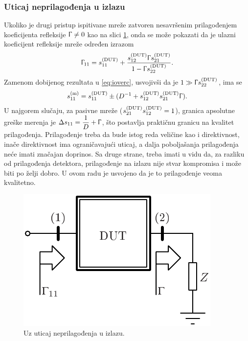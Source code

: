 \documentclass[a4paper, 12pt, diplomski]{etf}
\begin{document}
\subsubsection{Uticaj neprilagođenja u izlazu }
%
Ukoliko je drugi pristup ispitivane mreže zatvoren nesavršenim
prilagođenjem koeficijenta refleksije $\Upgamma \neq 0$ 
kao na slici \ref{fig:umatch}, onda
se može pokazati da je ulazni koeficijent refleksije mreže određen
izrazom
\begin{equation}
    \Upgamma_{11} = s_{\rm 11}^{\rm (DUT)} +
    \dfrac{s_{\rm 12}^{\rm (DUT)} \Upgamma s_{\rm 21}^{\rm (DUT)} }{1 - \Upgamma s_{\rm 22}^{\rm (DUT)}}.
\end{equation}
Zamenom dobijenog rezultata u \eqref{eq:ioverc}, usvojivši
da je $1 \gg \Upgamma s_{22}^{\rm (DUT)}$, ima se
\begin{equation}
    s_{11}^{\rm (m)} = s_{11}^{\rm (DUT)} \pm 
    (D^{-1} + s_{12}^{\rm (DUT)}s_{21}^{\rm (DUT)}\Upgamma).
\end{equation}
U najgorem slučaju, za  pasivne mreže 
($  s_{21}^{\rm (DUT)} s_{12}^{\rm (DUT)} = 1$),
granica apsolutne 
greške merenja je $\Delta s_{11} = \dfrac{1}{D} +\Upgamma$, što postavlja praktičnu
granicu na kvalitet prilagođenja. Prilagođenje treba da bude
istog reda veličine kao i direktivnost, inače direktivnost 
ima ograničavajući uticaj, a dalja poboljašanja prilagođenja neće imati značajan doprinos. Sa druge strane, treba imati u vidu
da, za razliku od prilagođenja detektora, prilagođenje 
na izlazu nije stvar kompromisa i može biti po želji dobro.
U ovom radu je usvojeno da je to prilagođenje veoma kvalitetno.
%
\begin{figure}[ht!]
    \centering
    \includegraphics[scale=0.8]{fig/gamma_in.pdf}
    \caption{Uz uticaj neprilagođenja u izlazu.}
    \label{fig:umatch}
\end{figure}
%
\end{document}
